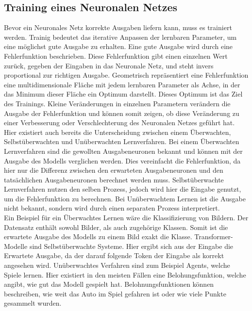\subsection{Training eines Neuronalen Netzes}\label{subsec:grundlagen:training}
Bevor ein Neuronales Netz korrekte Ausgaben liefern kann, muss es trainiert werden.
Trainig bedeutet das iterative Anpassen der lernbaren Parameter, um eine möglichst gute Ausgabe zu erhalten.
Eine gute Ausgabe wird durch eine Fehlerfunktion beschrieben.
Diese Fehlerfunktion gibt einen einzelnen Wert zurück, gegeben der Eingaben in das Neuronale Netz, und steht invers proportional zur richtigen Ausgabe.
Geometrisch repräsentiert eine Fehlerfunktion eine multidimensionale Fläche mit jedem lernbaren Parameter als Achse, in der das Minimum dieser Fläche ein Optimum darstellt.
Dieses Optimum ist das Ziel des Trainings.
Kleine Veränderungen in einzelnen Parametern verändern die Ausgabe der Fehlerfunktion und können somit zeigen, ob diese Veränderung zu einer Verbesserung oder Verschlechterung des Neuronalen Netzes geführt hat.\\

Hier existiert auch bereits die Unterscheidung zwischen einem Überwachten, Selbstüberwachten und Unüberwachten Lernverfahren.
Bei einem Überwachten Lernverfahren sind die gewollten Ausgabeneuronen bekannt und können mit der Ausgabe des Modells verglichen werden.
Dies vereinfacht die Fehlerfunktion, da hier nur die Differenz zwischen den erwarteten Ausgabeneuronen und den tatsächlichen Ausgabeneuronen berechnet werden muss.
Selbstüberwachte Lernverfahren nutzen den selben Prozess, jedoch wird hier die Eingabe genutzt, um die Fehlerfunktion zu berechnen.
Bei Unüberwachtem Lernen ist die Ausgabe nicht bekannt, sondern wird durch einen separaten Prozess interpretiert.\\

Ein Beispiel für ein Überwachtes Lernen wäre die Klassifizierung von Bildern.
Der Datensatz enthält sowohl Bilder, als auch zugehörige Klassen.
Somit ist die erwartete Ausgabe des Modells zu einem Bild exakt die Klasse.
Transformer-Modelle sind Selbstüberwachte Systeme.
Hier ergibt sich aus der Eingabe die Erwartete Ausgabe, da der darauf folgende Token der Eingabe als korrekt angesehen wird.
Unüberwachtes Verfahren sind zum Beispiel Agents, welche Spiele lernen.
Hier existiert in den meisten Fällen eine Belohungsfunktion, welche angibt, wie gut das Modell gespielt hat.
Belohnungsfunktionen können beschreiben, wie weit das Auto im Spiel gefahren ist oder wie viele Punkte gesammelt wurden.\\

